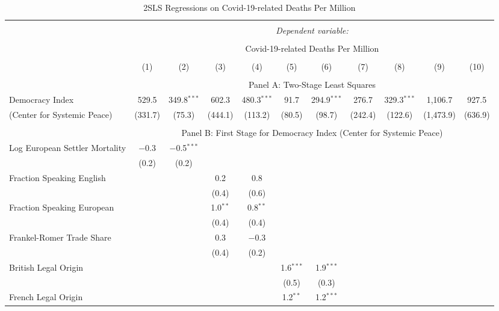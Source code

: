 
\begin{table}[!htbp] 
  \caption{2SLS Regressions on Covid-19-related Deaths Per Million}
  \label{tab:2sls-deaths-polity} 
  \footnotesize
  \begin{threeparttable}
\begin{tabular}{@{\extracolsep{0pt}}lcccccccccc} 
\\[-1.8ex]\hline 
\hline \\[-1.8ex] 
 & \multicolumn{10}{c}{\textit{Dependent variable:}} \\ 
\cline{2-11} 
\\[-1.8ex] & \multicolumn{10}{c}{Covid-19-related Deaths Per Million} \\ 
\\[-1.8ex] & (1) & (2) & (3) & (4) & (5) & (6) & (7) & (8) & (9) & (10)\\ 
\hline \\[-1.8ex] 
  & \multicolumn{10}{c}{Panel A: Two-Stage Least Squares} \\
 Democracy Index& 529.5 & 349.8$^{***}$ & 602.3 & 480.3$^{***}$ & 91.7 & 294.9$^{***}$ & 276.7 & 329.3$^{***}$ & 1,106.7 & 927.5 \\ 
 (Center for Systemic Peace)   & (331.7) & (75.3) & (444.1) & (113.2) & (80.5) & (98.7) & (242.4) & (122.6) & (1,473.9) & (636.9) \\ 
 \hline \\[-1.8ex] 
   & \multicolumn{10}{c}{Panel B: First Stage for Democracy Index (Center for Systemic Peace)} \\
  Log European Settler Mortality & $-$0.3 & $-$0.5$^{***}$ &  &  &  &  &  &  &  &  \\ 
  & (0.2) & (0.2) &  &  &  &  &  &  &  &  \\ 
  Fraction Speaking English &  &  & 0.2 & 0.8 &  &  &  &  &  &  \\ 
  &  &  & (0.4) & (0.6) &  &  &  &  &  &  \\ 
  Fraction Speaking European &  &  & 1.0$^{**}$ & 0.8$^{**}$ &  &  &  &  &  &  \\ 
  &  &  & (0.4) & (0.4) &  &  &  &  &  &  \\ 
  Frankel-Romer Trade Share &  &  & 0.3 & $-$0.3 &  &  &  &  &  &  \\ 
  &  &  & (0.4) & (0.2) &  &  &  &  &  &  \\ 
  British Legal Origin &  &  &  &  & 1.6$^{***}$ & 1.9$^{***}$ &  &  &  &  \\ 
  &  &  &  &  & (0.5) & (0.3) &  &  &  &  \\ 
  French Legal Origin &  &  &  &  & 1.2$^{**}$ & 1.2$^{***}$ &  &  &  &  \\ 

\end{tabular}
\end{threeparttable}
\end{table}

